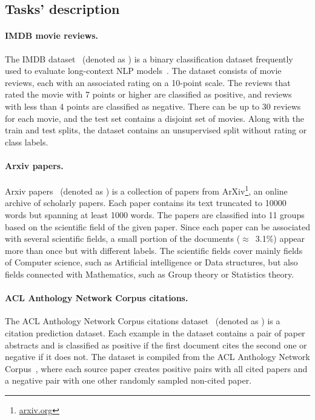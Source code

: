 \subsection{Tasks' description}

\paragraph{IMDB movie reviews.} The IMDB dataset~\citep{maas2011learning}
(denoted as ) is a binary classification dataset frequently used to
evaluate long-context NLP models~\citep{zaheer2020big, beltagy2020longformer,
le2014distributed}. The dataset consists of movie reviews, each with an
associated rating on a 10-point scale. The reviews that rated the movie with 7
points or higher are classified as positive, and reviews with less than 4
points are classified as negative. There can be up to 30 reviews for each
movie, and the test set contains a disjoint set of movies. Along with the train
and test splits, the dataset contains an unsupervised split without rating or
class labels.

\paragraph{Arxiv papers.} Arxiv papers~\citep{arxiv_papers} (denoted as
) is a collection of papers from ArXiv\footnote{\url{arxiv.org}},
an online archive of scholarly papers. Each paper contains its text truncated
to 10000 words but spanning at least 1000 words. The papers are classified into
11 groups based on the scientific field of the given paper. Since each paper
can be associated with several scientific fields, a small portion of the
documents ($\approx$~3.1\%) appear more than once but with different labels.
The scientific fields cover mainly fields of Computer science, such as
Artificial intelligence or Data structures, but also fields connected with
Mathematics, such as Group theory or Statistics theory.

\paragraph{ACL Anthology Network Corpus citations.} The ACL Anthology Network
Corpus citations dataset~\citep{zhou2020multilevel} (denoted as ) is
a citation prediction dataset. Each example in the dataset contains a pair of
paper abstracts and is classified as positive if the first document cites the
second one or negative if it does not. The dataset is compiled from the ACL
Anthology Network Corpus~\citep{radev2013acl}, where each source paper creates
positive pairs with all cited papers and a negative pair with one other randomly
sampled non-cited paper.

